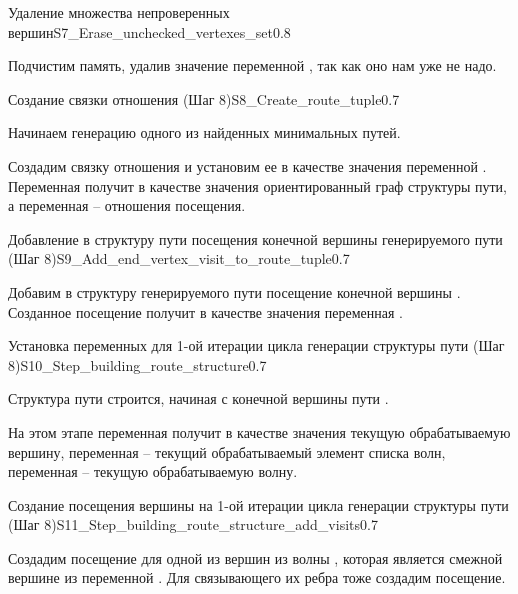 \begin{itemize}
\begin{algostep}{Удаление множества непроверенных
    вершин}{S7_Erase_unchecked_vertexes_set}{0.8}
 
  Подчистим память, удалив значение переменной
  , так как оно нам уже не надо.
\end{algostep}


\begin{algostep}{Создание связки отношения  (Шаг
    8)}{S8_Create_route_tuple}{0.7}
 
  Начинаем генерацию одного из найденных минимальных путей.

  Создадим связку отношения  и установим ее в качестве
  значения переменной . Переменная 
  получит в качестве значения ориентированный граф структуры пути, а
  переменная  – отношения посещения.
\end{algostep}


\begin{algostep}{Добавление в структуру пути посещения конечной
    вершины генерируемого пути (Шаг
    8)}{S9_Add_end_vertex_visit_to_route_tuple}{0.7}
 
  Добавим в структуру генерируемого пути посещение конечной вершины
  . Созданное посещение получит в качестве значения переменная
  .
\end{algostep}


\begin{algostep}{Установка переменных для 1-ой итерации цикла генерации
    структуры пути (Шаг 8)}{S10_Step_building_route_structure}{0.7}
  
  Структура пути строится, начиная с конечной вершины пути .

  На этом этапе переменная  получит в качестве
  значения текущую обрабатываемую вершину, переменная 
  – текущий обрабатываемый элемент списка волн, переменная
   – текущую обрабатываемую волну.
\end{algostep}


\begin{algostep}{Создание посещения вершины на 1-ой итерации цикла
    генерации структуры пути (Шаг
    8)}{S11_Step_building_route_structure_add_visits}{0.7}
 
  Создадим посещение для одной из вершин из волны ,
  которая является смежной вершине из переменной
  . Для связывающего их ребра тоже создадим
  посещение.
\end{algostep}  



\end{itemize}
